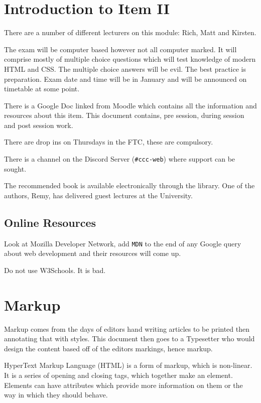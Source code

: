 
\section*{Introduction to Item II}
There are a number of different lecturers on this module: Rich, Matt and Kirsten.

The exam will be computer based however not all computer marked. It will comprise mostly of multiple choice questions which will test knowledge of modern HTML and CSS. The multiple choice answers will be evil. The best practice is preparation. Exam date and time will be in January and will be announced on timetable at some point.

There is a Google Doc linked from Moodle which contains all the information and resources about this item. This document contains, pre session, during session and post session work.

There are drop ins on Thursdays in the FTC, these are compulsory. 

There is a channel on the Discord Server (\texttt{\#ccc-web}) where support can be sought.

The recommended book is available electronically through the library. One of the authors, Remy, has delivered guest lectures at the University.

\subsection*{Online Resources}
Look at Mozilla Developer Network, add \texttt{MDN} to the end of any Google query about web development and their resources will come up.

Do not use W3Schools. It is bad.

\section*{Markup}
Markup comes from the days of editors hand writing articles to be printed then annotating that with styles. This document then goes to a Typesetter who would design the content based off of the editors markings, hence markup.

HyperText Markup Language (HTML) is a form of markup, which is non-linear. It is a series of opening and closing tags, which together make an element. Elements can have attributes which provide more information on them or the way in which they should behave. 

